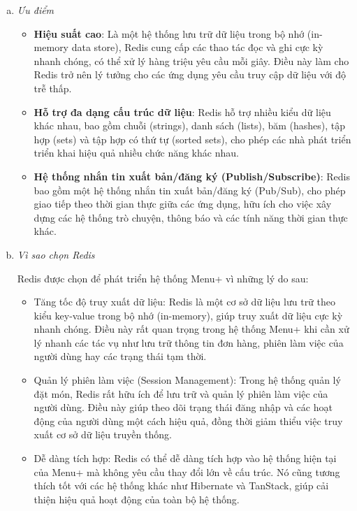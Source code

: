 \begin{enumerate}[(a)]
        \item \textit{Ưu điểm} \cite{Redis}

        \begin{itemize}
            \item \textbf{Hiệu suất cao}: Là một hệ thống lưu trữ dữ liệu trong bộ nhớ (in-memory data store), Redis cung cấp các thao tác đọc và ghi cực kỳ nhanh chóng, có thể xử lý hàng triệu yêu cầu mỗi giây. Điều này làm cho Redis trở nên lý tưởng cho các ứng dụng yêu cầu truy cập dữ liệu với độ trễ thấp.
            \item \textbf{Hỗ trợ đa dạng cấu trúc dữ liệu}: Redis hỗ trợ nhiều kiểu dữ liệu khác nhau, bao gồm chuỗi (strings), danh sách (lists), băm (hashes), tập hợp (sets) và tập hợp có thứ tự (sorted sets), cho phép các nhà phát triển triển khai hiệu quả nhiều chức năng khác nhau.
            \item \textbf{Hệ thống nhắn tin xuất bản/đăng ký (Publish/Subscribe)}: Redis bao gồm một hệ thống nhắn tin xuất bản/đăng ký (Pub/Sub), cho phép giao tiếp theo thời gian thực giữa các ứng dụng, hữu ích cho việc xây dựng các hệ thống trò chuyện, thông báo và các tính năng thời gian thực khác.
        \end{itemize}

        \item \textit{Vì sao chọn Redis}

        Redis được chọn để phát triển hệ thống Menu+ vì những lý do sau:

        \begin{itemize}
            \item Tăng tốc độ truy xuất dữ liệu: Redis là một cơ sở dữ liệu lưu trữ theo kiểu key-value trong bộ nhớ (in-memory), giúp truy xuất dữ liệu cực kỳ nhanh chóng. Điều này rất quan trọng trong hệ thống Menu+ khi cần xử lý nhanh các tác vụ như lưu trữ thông tin đơn hàng, phiên làm việc của người dùng hay các trạng thái tạm thời.
            \item Quản lý phiên làm việc (Session Management): Trong hệ thống quản lý đặt món, Redis rất hữu ích để lưu trữ và quản lý phiên làm việc của người dùng. Điều này giúp theo dõi trạng thái đăng nhập và các hoạt động của người dùng một cách hiệu quả, đồng thời giảm thiểu việc truy xuất cơ sở dữ liệu truyền thống.
            \item Dễ dàng tích hợp: Redis có thể dễ dàng tích hợp vào hệ thống hiện tại của Menu+ mà không yêu cầu thay đổi lớn về cấu trúc. Nó cũng tương thích tốt với các hệ thống khác như Hibernate và TanStack, giúp cải thiện hiệu quả hoạt động của toàn bộ hệ thống.
        \end{itemize}


\end{enumerate}
